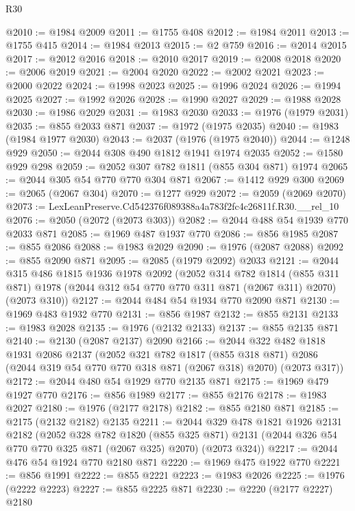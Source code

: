 \begin{lexlean}{R30}
\begin{coremodule}
@2010 := @1984 @2009
@2011 := @1755 @408
@2012 := @1984 @2011
@2013 := @1755 @415
@2014 := @1984 @2013
@2015 := @2 @759
@2016 := @2014 @2015
@2017 := @2012 @2016
@2018 := @2010 @2017
@2019 := @2008 @2018
@2020 := @2006 @2019
@2021 := @2004 @2020
@2022 := @2002 @2021
@2023 := @2000 @2022
@2024 := @1998 @2023
@2025 := @1996 @2024
@2026 := @1994 @2025
@2027 := @1992 @2026
@2028 := @1990 @2027
@2029 := @1988 @2028
@2030 := @1986 @2029
@2031 := @1983 @2030
@2033 := @1976 (@1979 @2031)
@2035 := @855 @2033 @871
@2037 := @1972 (@1975 @2035)
@2040 := @1983 (@1984 @1977 @2030)
@2043 := @2037 (@1976 (@1975 @2040))
@2044 := @1248 @929
@2050 := @2044 @308 @490 @1812 @1941 @1974 @2035
@2052 := @1580 @929 @298
@2059 := @2052 @307 @782 @1811 (@855 @304 @871) @1974
@2065 := @2044 @305 @54 @770 @770 @304 @871
@2067 := @1412 @929 @300
@2069 := @2065 (@2067 @304)
@2070 := @1277 @929
@2072 := @2059 (@2069 @2070)
@2073 := LexLeanPreserve.Cd542376f089388a4a783f2fc4c26811f.R30.__rel_10
@2076 := @2050 (@2072 (@2073 @303))
@2082 := @2044 @488 @54 @1939 @770 @2033 @871
@2085 := @1969 @487 @1937 @770
@2086 := @856 @1985
@2087 := @855 @2086
@2088 := @1983 @2029
@2090 := @1976 (@2087 @2088)
@2092 := @855 @2090 @871
@2095 := @2085 (@1979 @2092) @2033
@2121 := @2044
    @315
    @486
    @1815
    @1936
    @1978
    @2092
    (@2052
      @314
      @782
      @1814
      (@855 @311 @871)
      @1978
      (@2044 @312 @54 @770 @770 @311 @871 (@2067 @311) @2070)
      (@2073 @310))
@2127 := @2044 @484 @54 @1934 @770 @2090 @871
@2130 := @1969 @483 @1932 @770
@2131 := @856 @1987
@2132 := @855 @2131
@2133 := @1983 @2028
@2135 := @1976 (@2132 @2133)
@2137 := @855 @2135 @871
@2140 := @2130 (@2087 @2137) @2090
@2166 := @2044
    @322
    @482
    @1818
    @1931
    @2086
    @2137
    (@2052
      @321
      @782
      @1817
      (@855 @318 @871)
      @2086
      (@2044 @319 @54 @770 @770 @318 @871 (@2067 @318) @2070)
      (@2073 @317))
@2172 := @2044 @480 @54 @1929 @770 @2135 @871
@2175 := @1969 @479 @1927 @770
@2176 := @856 @1989
@2177 := @855 @2176
@2178 := @1983 @2027
@2180 := @1976 (@2177 @2178)
@2182 := @855 @2180 @871
@2185 := @2175 (@2132 @2182) @2135
@2211 := @2044
    @329
    @478
    @1821
    @1926
    @2131
    @2182
    (@2052
      @328
      @782
      @1820
      (@855 @325 @871)
      @2131
      (@2044 @326 @54 @770 @770 @325 @871 (@2067 @325) @2070)
      (@2073 @324))
@2217 := @2044 @476 @54 @1924 @770 @2180 @871
@2220 := @1969 @475 @1922 @770
@2221 := @856 @1991
@2222 := @855 @2221
@2223 := @1983 @2026
@2225 := @1976 (@2222 @2223)
@2227 := @855 @2225 @871
@2230 := @2220 (@2177 @2227) @2180

\end{coremodule}
\end{lexlean}
